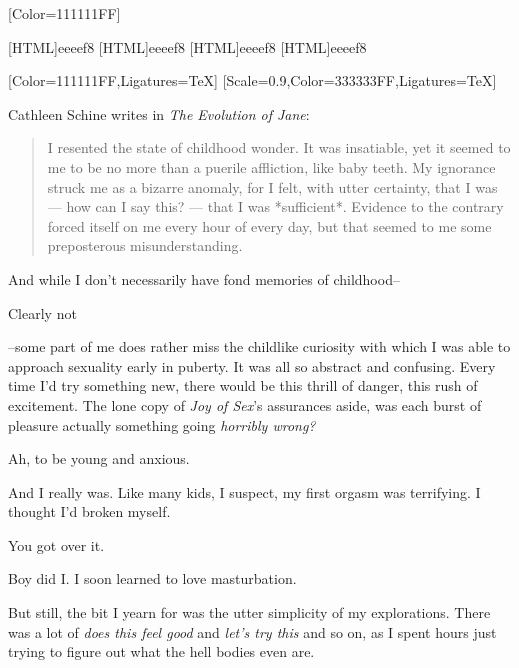 \renewfontfamily{}[Color=111111FF]

[HTML]{eeeef8}
[HTML]{eeeef8}
[HTML]{eeeef8}
[HTML]{eeeef8}

\begin{paracol}{2}
\begin{leftcolumn}

[Color=111111FF,Ligatures=TeX]
\renewfontfamily{}[Scale=0.9,Color=333333FF,Ligatures=TeX]

\noindent Cathleen Schine writes in \emph{The Evolution of Jane}:

\begin{quotation}
  I resented the state of childhood wonder.  It was insatiable, yet it seemed to me to be no more than a puerile affliction, like baby teeth.  My ignorance struck me as a bizarre anomaly, for I felt, with utter certainty, that I was --- how can I say this? --- that I was *sufficient*.  Evidence to the contrary forced itself on me every hour of every day, but that seemed to me some preposterous misunderstanding.
\end{quotation}
And while I don't necessarily have fond memories of childhood--

\begin{ally}
Clearly not
\end{ally}
--some part of me does rather miss the childlike curiosity with which I was able to approach sexuality early in puberty. It was all so abstract and confusing. Every time I'd try something new, there would be this thrill of danger, this rush of excitement. The lone copy of \emph{Joy of Sex}'s assurances aside, was each burst of pleasure actually something going \emph{horribly wrong?}

\begin{ally}
Ah, to be young and anxious.
\end{ally}
And I really was. Like many kids, I suspect, my first orgasm was terrifying. I thought I'd broken myself.

\begin{ally}
You got over it.
\end{ally}
Boy did I. I soon learned to love masturbation.

But still, the bit I yearn for was the utter simplicity of my explorations. There was a lot of \emph{does this feel good} and \emph{let's try this} and so on, as I spent hours just trying to figure out what the hell bodies even are.


\end{leftcolumn}
\end{paracol}
